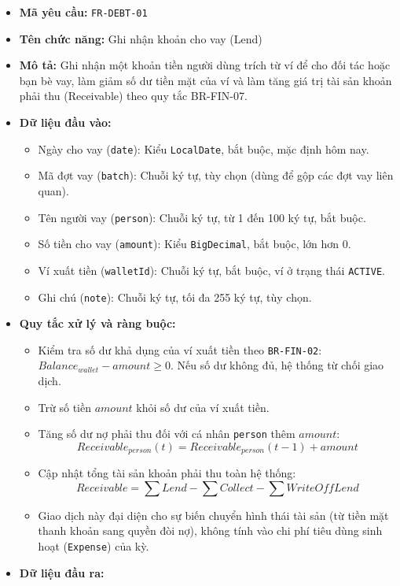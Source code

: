 \documentclass[11pt,a4paper]{article}
\providecommand{\tightlist}{
  \setlength{\itemsep}{0pt}\setlength{\parskip}{0pt}}
\begin{document}
\begin{itemize}
\tightlist
\item
  \textbf{Mã yêu cầu:} \texttt{FR-DEBT-01}
\item
  \textbf{Tên chức năng:} Ghi nhận khoản cho vay (Lend)
\item
  \textbf{Mô tả:} Ghi nhận một khoản tiền người dùng trích từ ví để cho
  đối tác hoặc bạn bè vay, làm giảm số dư tiền mặt của ví và làm tăng
  giá trị tài sản khoản phải thu (Receivable) theo quy tắc BR-FIN-07.
\item
  \textbf{Dữ liệu đầu vào:}

  \begin{itemize}
  \tightlist
  \item
    Ngày cho vay (\texttt{date}): Kiểu \texttt{LocalDate}, bắt buộc, mặc
    định hôm nay.
  \item
    Mã đợt vay (\texttt{batch}): Chuỗi ký tự, tùy chọn (dùng để gộp các
    đợt vay liên quan).
  \item
    Tên người vay (\texttt{person}): Chuỗi ký tự, từ 1 đến 100 ký tự,
    bắt buộc.
  \item
    Số tiền cho vay (\texttt{amount}): Kiểu \texttt{BigDecimal}, bắt
    buộc, lớn hơn 0.
  \item
    Ví xuất tiền (\texttt{walletId}): Chuỗi ký tự, bắt buộc, ví ở trạng
    thái \texttt{ACTIVE}.
  \item
    Ghi chú (\texttt{note}): Chuỗi ký tự, tối đa 255 ký tự, tùy chọn.
  \end{itemize}
\item
  \textbf{Quy tắc xử lý và ràng buộc:}

  \begin{itemize}
  \tightlist
  \item
    Kiểm tra số dư khả dụng của ví xuất tiền theo \texttt{BR-FIN-02}:
    \(Balance_{wallet} - amount \ge 0\). Nếu số dư không đủ, hệ thống từ
    chối giao dịch.
  \item
    Trừ số tiền \(amount\) khỏi số dư của ví xuất tiền.
  \item
    Tăng số dư nợ phải thu đối với cá nhân \texttt{person} thêm
    \(amount\):
    \[Receivable_{person}(t) = Receivable_{person}(t-1) + amount\]
  \item
    Cập nhật tổng tài sản khoản phải thu toàn hệ thống:
    \[
    Receivable = \sum Lend - \sum Collect - \sum WriteOffLend
    \]
  \item
    Giao dịch này đại diện cho sự biến chuyển hình thái tài sản (từ tiền
    mặt thanh khoản sang quyền đòi nợ), không tính vào chi phí tiêu dùng
    sinh hoạt (\texttt{Expense}) của kỳ.
  \end{itemize}
\item
  \textbf{Dữ liệu đầu ra:}


\end{itemize}
\end{document}
